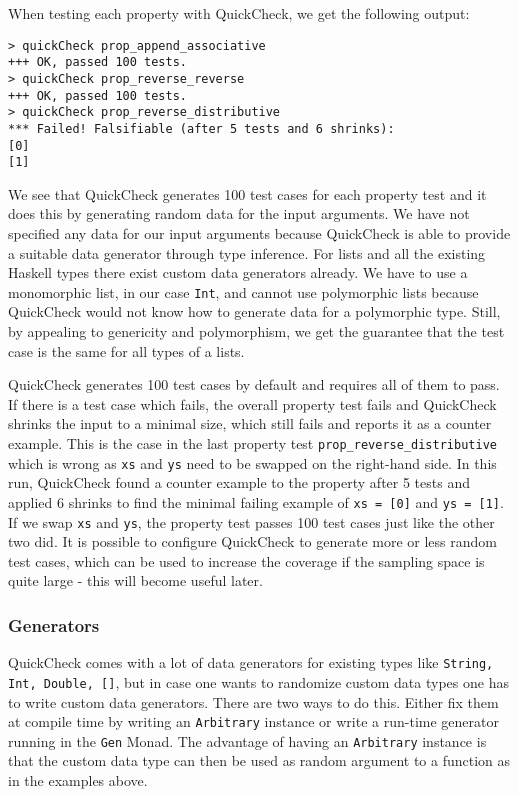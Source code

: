 When testing each property with QuickCheck, we get the following output:

\begin{verbatim}
> quickCheck prop_append_associative
+++ OK, passed 100 tests.
> quickCheck prop_reverse_reverse
+++ OK, passed 100 tests.
> quickCheck prop_reverse_distributive
*** Failed! Falsifiable (after 5 tests and 6 shrinks):    
[0]
[1]
\end{verbatim}

We see that QuickCheck generates 100 test cases for each property test and it does this by generating random data for the input arguments. We have not specified any data for our input arguments because QuickCheck is able to provide a suitable data generator through type inference. For lists and all the existing Haskell types there exist custom data generators already. We have to use a monomorphic list, in our case \texttt{Int}, and cannot use polymorphic lists because QuickCheck would not know how to generate data for a polymorphic type. Still, by appealing to genericity and polymorphism, we get the guarantee that the test case is the same for all types of a lists.

QuickCheck generates 100 test cases by default and requires all of them to pass. If there is a test case which fails, the overall property test fails and QuickCheck shrinks the input to a minimal size, which still fails and reports it as a counter example. This is the case in the last property test \texttt{prop\_reverse\_distributive} which is wrong as \texttt{xs} and \texttt{ys} need to be swapped on the right-hand side. In this run, QuickCheck found a counter example to the property after 5 tests and applied 6 shrinks to find the minimal failing example of \texttt{xs = [0]} and \texttt{ys = [1]}. If we swap \texttt{xs} and \texttt{ys}, the property test passes 100 test cases just like the other two did. It is possible to configure QuickCheck to generate more or less random test cases, which can be used to increase the coverage if the sampling space is quite large - this will become useful later.

\subsubsection{Generators}
QuickCheck comes with a lot of data generators for existing types like \texttt{String, Int, Double, []}, but in case one wants to randomize custom data types one has to write custom data generators. There are two ways to do this. Either fix them at compile time by writing an \texttt{Arbitrary} instance or write a run-time generator running in the \texttt{Gen} Monad. The advantage of having an \texttt{Arbitrary} instance is that the custom data type can then be used as random argument to a function as in the examples above.

